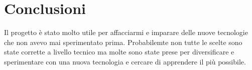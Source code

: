 \documentclass[11pt]{article}
\begin{document}
    \section{Conclusioni}
    Il progetto è stato molto utile per affacciarmi e imparare delle nuove tecnologie che non avevo mai sperimentato prima.
    Probabilemte non tutte le scelte sono state corrette a livello tecnico ma molte sono state prese per diversificare e sperimentare
    con una nuova tecnologia e cercare di apprendere il più possibile.
    
\end{document}
